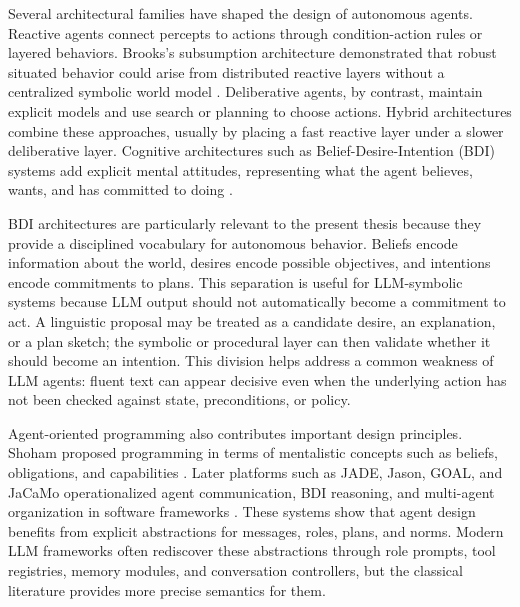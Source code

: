 Several architectural families have shaped the design of autonomous agents. Reactive agents connect percepts to actions through condition-action rules or layered behaviors. Brooks's subsumption architecture demonstrated that robust situated behavior could arise from distributed reactive layers without a centralized symbolic world model \cite{brooks1986robust}. Deliberative agents, by contrast, maintain explicit models and use search or planning to choose actions. Hybrid architectures combine these approaches, usually by placing a fast reactive layer under a slower deliberative layer. Cognitive architectures such as Belief-Desire-Intention (BDI) systems add explicit mental attitudes, representing what the agent believes, wants, and has committed to doing \cite{bratman1987intention,rao1991modeling,rao1995bdi,georgeff1999belief}.

BDI architectures are particularly relevant to the present thesis because they provide a disciplined vocabulary for autonomous behavior. Beliefs encode information about the world, desires encode possible objectives, and intentions encode commitments to plans. This separation is useful for LLM-symbolic systems because LLM output should not automatically become a commitment to act. A linguistic proposal may be treated as a candidate desire, an explanation, or a plan sketch; the symbolic or procedural layer can then validate whether it should become an intention. This division helps address a common weakness of LLM agents: fluent text can appear decisive even when the underlying action has not been checked against state, preconditions, or policy.

Agent-oriented programming also contributes important design principles. Shoham proposed programming in terms of mentalistic concepts such as beliefs, obligations, and capabilities \cite{shoham1993agent}. Later platforms such as JADE, Jason, GOAL, and JaCaMo operationalized agent communication, BDI reasoning, and multi-agent organization in software frameworks \cite{bellifemine2007developing,bordini2007programming,hindriks2009programming,boissier2013multi}. These systems show that agent design benefits from explicit abstractions for messages, roles, plans, and norms. Modern LLM frameworks often rediscover these abstractions through role prompts, tool registries, memory modules, and conversation controllers, but the classical literature provides more precise semantics for them.

